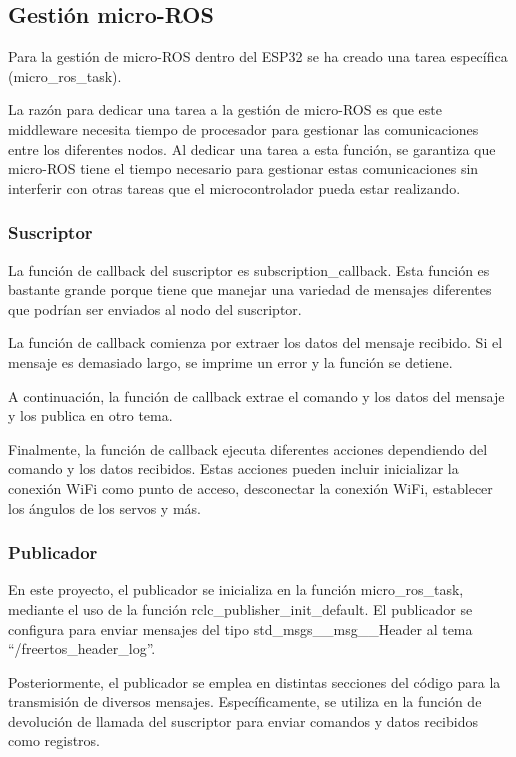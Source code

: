 \subsection{Gestión micro-ROS}
Para la gestión de micro-ROS dentro del ESP32 se ha creado una tarea específica (micro\_ros\_task).



La razón para dedicar una tarea a la gestión de micro-ROS es que este middleware necesita tiempo de procesador para gestionar las comunicaciones entre los diferentes nodos. Al dedicar una tarea a esta función, se garantiza que micro-ROS tiene el tiempo necesario para gestionar estas comunicaciones sin interferir con otras tareas que el microcontrolador pueda estar realizando.

\subsubsection{Suscriptor}
La función de callback del suscriptor es subscription\_callback. Esta función es bastante grande porque tiene que manejar una variedad de mensajes diferentes que podrían ser enviados al nodo del suscriptor.



La función de callback comienza por extraer los datos del mensaje recibido. Si el mensaje es demasiado largo, se imprime un error y la función se detiene.



A continuación, la función de callback extrae el comando y los datos del mensaje y los publica en otro tema.



Finalmente, la función de callback ejecuta diferentes acciones dependiendo del comando y los datos recibidos. Estas acciones pueden incluir inicializar la conexión WiFi como punto de acceso, desconectar la conexión WiFi, establecer los ángulos de los servos y más.

\subsubsection{Publicador}
En este proyecto, el publicador se inicializa en la función micro\_ros\_task, mediante el uso de la función rclc\_publisher\_init\_default. El publicador se configura para enviar mensajes del tipo std\_msgs\_\_msg\_\_Header al tema ``/freertos\_header\_log''.



Posteriormente, el publicador se emplea en distintas secciones del código para la transmisión de diversos mensajes. Específicamente, se utiliza en la función de devolución de llamada del suscriptor para enviar comandos y datos recibidos como registros.



